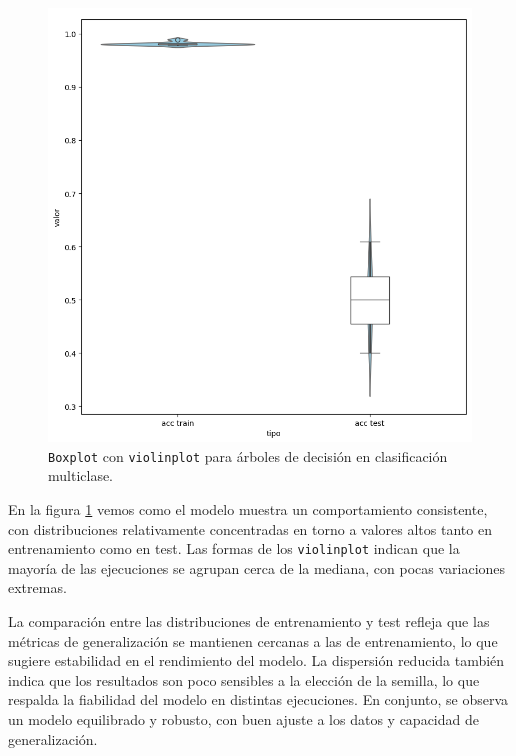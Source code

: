 \begin{figure}[H]
	\centering
	\includegraphics[width=1\linewidth]{Imagenes/dt_multi}
	\caption[\texttt{Boxplot} con \texttt{violinplot} para árboles de decisión en clasificación multiclase]{\texttt{Boxplot} con \texttt{violinplot} para árboles de decisión en clasificación multiclase.}
	\label{fig:dt_multi}
\end{figure}

En la figura \ref{fig:dt_multi} vemos como el modelo muestra un comportamiento consistente, con distribuciones relativamente concentradas en torno a valores altos tanto en entrenamiento como en test. Las formas de los \texttt{violinplot} indican que la mayoría de las ejecuciones se agrupan cerca de la mediana, con pocas variaciones extremas.

\vspace{1em}

La comparación entre las distribuciones de entrenamiento y test refleja que las métricas de generalización se mantienen cercanas a las de entrenamiento, lo que sugiere estabilidad en el rendimiento del modelo. La dispersión reducida también indica que los resultados son poco sensibles a la elección de la semilla, lo que respalda la fiabilidad del modelo en distintas ejecuciones. En conjunto, se observa un modelo equilibrado y robusto, con buen ajuste a los datos y capacidad de generalización.

